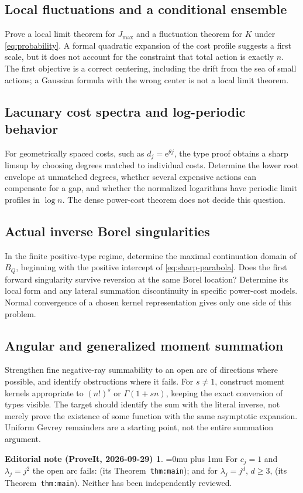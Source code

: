 \documentclass[11pt,a4paper]{article}
\numberwithin{equation}{section}
\theoremstyle{definition}
\theoremstyle{remark}
\theoremstyle{definition}
\newtheorem*{ednoteinner}{Editorial note (ProveIt, 2026-09-29)}
\newenvironment{ednote}{\begin{ednoteinner}\sloppy\Urlmuskip=0mu plus 1mu\relax}{\end{ednoteinner}}
\newcommand{\e}{\mathrm e}
\begin{document}
\subsection{Local fluctuations and a conditional ensemble}
Prove a local limit theorem for $J_{\max}$ and a fluctuation theorem for
$K$ under \eqref{eq:probability}. A formal quadratic expansion of the
cost profile suggests a first scale, but it does not account for the
constraint that total action is exactly $n$. The first objective is a
correct centering, including the drift from the sea of small actions;
a Gaussian formula with the wrong center is not a local limit theorem.

\subsection{Lacunary cost spectra and log-periodic behavior}
For geometrically spaced costs, such as $d_j=\e^{\theta j}$, the type
proof obtains a sharp limsup by choosing degrees matched to individual
costs. Determine the lower root envelope at unmatched degrees, whether
several expensive actions can compensate for a gap, and whether the
normalized logarithms have periodic limit profiles in $\log n$.
The dense power-cost theorem does not decide this question.

\subsection{Actual inverse Borel singularities}
In the finite positive-type regime, determine the maximal continuation
domain of $B_Q$, beginning with the positive intercept of
\eqref{eq:sharp-parabola}. Does the first forward singularity survive
reversion at the same Borel location? Determine its local form and any
lateral summation discontinuity in specific power-cost models. Normal
convergence of a chosen kernel representation gives only one side of
this problem.

\subsection{Angular and generalized moment summation}
Strengthen fine negative-ray summability to an open arc of directions
where possible, and identify obstructions where it fails. For $s\ne1$,
construct moment kernels appropriate to $(n!)^s$ or
$\Gamma(1+sn)$, keeping the exact conversion of types visible.
The target should identify the sum with the literal inverse, not merely
prove the existence of some function with the same asymptotic expansion.
Uniform Gevrey remainders are a starting point, not the entire summation
argument.
\begin{ednote}
For $c_j=1$ and $\lambda_j=j^2$ the open arc fails:
 \cite{ed:nbq}
(its Theorem~\texttt{thm:main}); and for $\lambda_j=j^d$, $d\ge3$,
 \cite{ed:nbs} (its
Theorem~\texttt{thm:main}). Neither has been independently reviewed.
\end{ednote}
\end{document}

